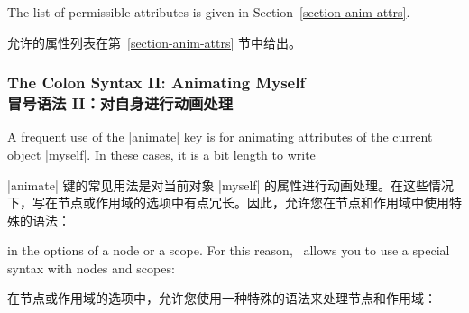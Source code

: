 The list of permissible attributes is given in
Section~\ref{section-anim-attrs}.

允许的属性列表在第~\ref{section-anim-attrs} 节中给出。


\subsubsection{The Colon Syntax II: Animating Myself\\冒号语法 II：对自身进行动画处理}

A frequent use of the |animate| key is for animating attributes of the current
object |myself|. In these cases, it is a bit length to write

|animate| 键的常见用法是对当前对象 |myself| 的属性进行动画处理。在这些情况下，写在节点或作用域的选项中有点冗长。因此，\tikzname 允许您在节点和作用域中使用特殊的语法：


\begin{codeexample}
\end{codeexample}
%
\noindent in the options of a node or a scope. For this reason, \tikzname\
allows you to use a special syntax with nodes and scopes:


\noindent 在节点或作用域的选项中，\tikzname 允许您使用一种特殊的语法来处理节点和作用域：



